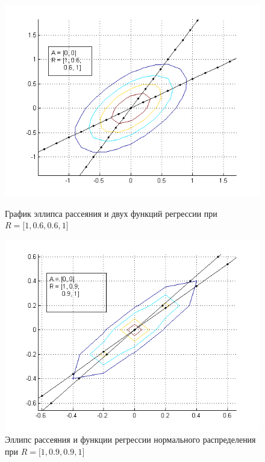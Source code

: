 \begin{figure}[h!]
  \begin{minipage}[h!]{0.47\linewidth}
    \includegraphics[width=1\linewidth]{pic/new/normal_regr_3}
    \caption{График эллипса рассеяния и двух функций регрессии при
      $ R = \big[1, 0.6, 0.6, 1 \big] $}
  \end{minipage}
  \hfill
  \begin{minipage}[h!]{0.47\linewidth}
    \vspace{4mm}
    \includegraphics[width=1\linewidth]{pic/new/normal_regr_4}
    \caption{Эллипс рассеяния и функции регрессии 
       нормального распределения при
      $ R = \big[1, 0.9, 0.9, 1 \big] $
    }\label{pic:normal_regr_end}
  \end{minipage}
\end{figure}

\newpage
